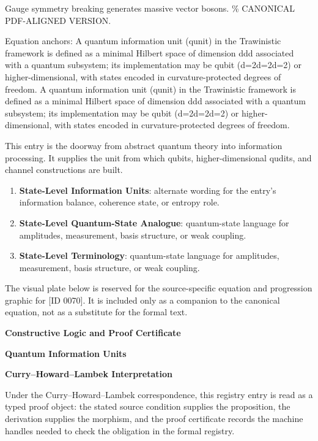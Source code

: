 Gauge symmetry breaking generates massive vector bosons. \% CANONICAL PDF-ALIGNED VERSION.

Equation anchors: A quantum information unit (qunit) in the Trawinistic framework is defined as a minimal Hilbert space of dimension ddd associated with a quantum subsystem; its implementation may be qubit (d=2d=2d=2) or higher-dimensional, with states encoded in curvature-protected degrees of freedom. A quantum information unit (qunit) in the Trawinistic framework is defined as a minimal Hilbert space of dimension ddd associated with a quantum subsystem; its implementation may be qubit (d=2d=2d=2) or higher-dimensional, with states encoded in curvature-protected degrees of freedom.

This entry is the doorway from abstract quantum theory into information processing. It supplies the unit from which qubits, higher-dimensional qudits, and channel constructions are built.
\endgroup

\begingroup\footnotesize\sloppy
\begin{enumerate}[leftmargin=1.35em,itemsep=1pt,topsep=1pt,parsep=0pt]
\item \textbf{State-Level Information Units}: alternate wording for the entry's information balance, coherence state, or entropy role.
\item \textbf{State-Level Quantum-State Analogue}: quantum-state language for amplitudes, measurement, basis structure, or weak coupling.
\item \textbf{State-Level Terminology}: quantum-state language for amplitudes, measurement, basis structure, or weak coupling.
\end{enumerate}
\endgroup

\begingroup\footnotesize\sloppy
The visual plate below is reserved for the source-specific equation and progression graphic for [ID 0070]. It is included only as a companion to the canonical equation, not as a substitute for the formal text.
\par\endgroup
\ifTZPDarkEdition
{}
\fi

\clearpage
\begingroup\tzpsupportsetup
\noindent\textbf{\fontsize{10.8pt}{12.8pt}\selectfont [ID 0070] Constructive Logic and Proof Certificate}\par
\noindent\textbf{\fontsize{10pt}{12pt}\selectfont Quantum Information Units}\par
\vspace{0.45em}
\begingroup
\footnotesize
\setlength{\parskip}{0.22em}
\setlength{\parindent}{0pt}
\noindent\textbf{Curry--Howard--Lambek Interpretation}\par
Under the Curry--Howard--Lambek correspondence, this registry entry is read as a typed proof
object: the stated source condition supplies the proposition, the derivation supplies the
morphism, and the proof certificate records the machine handles needed to check the obligation
in the formal registry.

